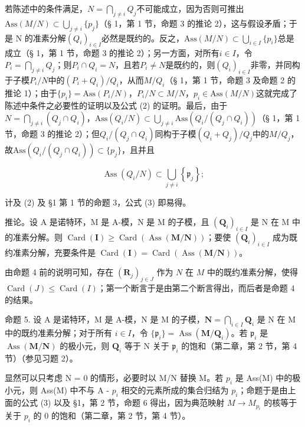 若陈述中的条件满足，\(N = \bigcap_{j \neq i} Q_j\)不可能成立，因为否则可推出\(\text{Ass}(M/N) \subset \bigcup_{j \neq i} \{p_j\}\)（§ 1，第 1 节，命题 3 的推论 2），这与假设矛盾；于是 N 的准素分解\((Q_i)_{i \in I}\)必然是既约的。反之，\(\text{Ass}(M/N) \subset \bigcup_{i \in I} \{p_i\}\)总是成立（§ 1，第 1 节，命题 3 的推论 2）；另一方面，对所有\(i \in I\)，令\(P_i = \bigcap_{j \neq i} Q_j\)；则\(P_i \cap Q_i = N\)，且若\(P_i \neq N\)是既约的，则\((Q_i)_{i \in I}\)非零，并同构于子模\(P_i/N\)中的\((P_i + Q_i)/Q_i\)，从而\(M/Q_i\)（§ 1，第 1 节，命题 3 及命题 2 的推论 1）；由于\(\{p_i\} = \text{Ass}(P_i/N)\)，\(P_i/N \subset M/N\)，\(p_i \in \text{Ass}(M/N)\)这就完成了陈述中条件之必要性的证明以及公式 (2) 的证明。最后，由于\(N = \bigcap_{j \neq i} (Q_j \cap Q_i)\)，\(\text{Ass}(Q_i/N) \subset \bigcup_{j \neq i} \text{Ass}(Q_i/(Q_j \cap Q_i))\)（§ 1，第 1 节，命题 3 的推论 2）；但\(Q_i/(Q_j \cap Q_i)\)同构于子模\((Q_i + Q_j)/Q_j\)中的\(M/Q_j\)，故\(\text{Ass}(Q_i/(Q_j \cap Q_i)) \subset \{p_j\}\)，且并且

\[
\operatorname{Ass} \left(Q _ {i} / N\right) \subset \bigcup_ {j \neq i} \left\{\mathfrak {p} _ {j} \right\};
\]

计及 (2) 及 §1 第 1 节的命题 3，公式 (3) 即易得。

推论。设 A 是诺特环，M 是 A-模，N 是 M 的子模，且 \((\mathbf{Q}_{i})_{i\in I}\) 是 N 在 M 中的准素分解。则 \(\operatorname{Card}(\mathbf{I}) \geqslant \operatorname{Card}(\operatorname{Ass}(\mathbf{M}/\mathbf{N}))\)；要使 \((\mathbf{Q}_{i})_{i\in I}\) 成为既约准素分解，充要条件是 \(\operatorname{Card}(\mathbf{I}) = \operatorname{Card}(\operatorname{Ass}(\mathbf{M}/\mathbf{N}))\)。

由命题 4 前的说明可知，存在 \((\mathbf{R}_j)_{j\in J}\) 作为 \(N\) 在 \(M\) 中的既约准素分解，使得 \(\operatorname{Card}(J) \leqslant \operatorname{Card}(I)\)；第一个断言于是由第二个断言得出，而后者是命题 4 的结果。

命题 5. 设 A 是诺特环，M 是 A-模，N 是 M 的子模，\(\mathbf{N} = \bigcap_{i \in I} \mathbf{Q}_i\) 是 N 在 M 中的既约准素分解；对于所有 \(i \in I\)，令 \(\{\mathfrak{p}_i\} = \operatorname{Ass}(\mathbf{M} / \mathbf{Q}_i)\)。若 \(\mathfrak{p}_i\) 是 \(\operatorname{Ass}(\mathbf{M} / \mathbf{N})\) 的极小元，则 \(\mathbf{Q}_i\) 等于 N 关于 \(\mathfrak{p}_i\) 的饱和（第二章，第 2 节，第 4 节）（参见习题 2）。

显然可以只考虑 N = 0 的情形，必要时以 M/N 替换 M。若 \(p_{i}\) 是 Ass(M) 中的极小元，则 Ass(M) 中不与 A - \(p_{i}\) 相交的元素所成的集合归结为 \(p_{i}\)；命题于是由上面的公式 (3) 以及 §1，第 2 节，命题 6 得出，因为典范映射 \(M \to M_{p_{i}}\) 的核等于关于 \(p_{i}\) 的 0 的饱和（第二章，第 2 节，第 4 节）。


